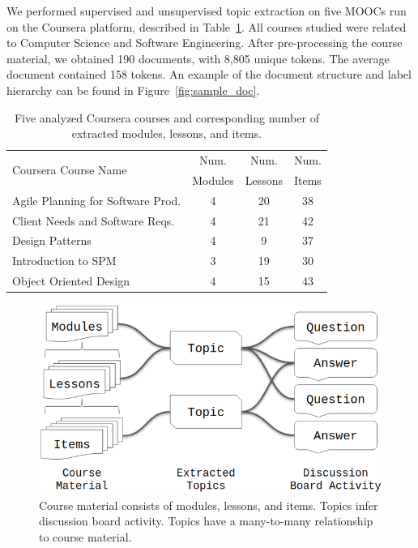 \documentclass[sigconf, anonymous]{acmart}
\begin{document}
We performed supervised and unsupervised topic extraction on five
MOOCs run on the Coursera platform, described in Table~\ref{tab:uofa-courses}.
All courses studied were related to Computer Science and Software Engineering.
After pre-processing the course material, we obtained 190 documents, with 8,805 unique tokens.
The average document contained 158 tokens.
An example of the document structure and label hierarchy can be found in Figure~\ref{fig:sample_doc}.

\begin{table}
\begin{tabularx}{\columnwidth}{@{}p{}ccc@{}}
    \toprule
    \multirow{2}{*}{Coursera Course Name} & Num. & Num. & Num. \\
    & Modules & Lessons & Items \\
    \midrule
    Agile Planning for Software Prod. & 4 & 20 & 38 \\
    Client Needs and Software Reqs. & 4 & 21 & 42 \\
    Design Patterns & 4 & 9 & 37 \\
    Introduction to SPM & 3 & 19 & 30 \\
    Object Oriented Design & 4 & 15 & 43 \\
    \bottomrule
\end{tabularx}
\caption{Five analyzed Coursera courses and corresponding number of extracted modules, lessons, and items.}
\label{tab:uofa-courses}
\end{table}

\begin{figure}
    \centering
    \includegraphics[width=\columnwidth]{fig/data_model}
    \caption{Course material consists of modules, lessons, and items. Topics infer discussion board activity. Topics have a many-to-many relationship to course material.}
    \label{fig:data_model}
\end{figure}
\end{document}
